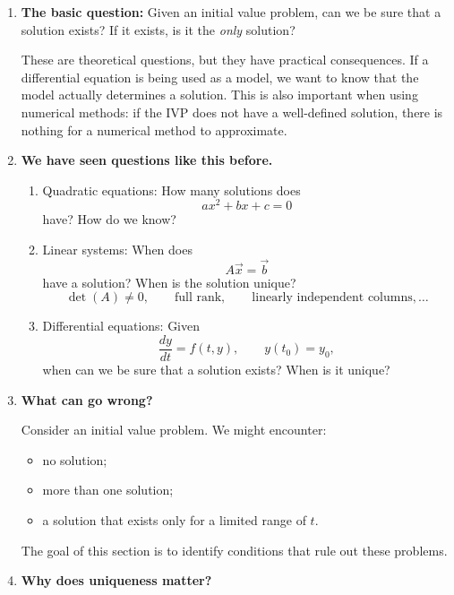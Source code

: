 \documentclass{article}
\begin{document}
\begin{enumerate}

\item \textbf{The basic question:} Given an initial value problem, can we be sure that a solution exists? If it exists, is it the \emph{only} solution?
    
These are theoretical questions, but they have practical consequences. If a differential equation is being used as a model, we want to know that the model actually determines a solution. This is also important when using numerical methods: if the IVP does not have a well-defined solution, there is nothing for a numerical method to approximate.

\item \textbf{We have seen questions like this before.}
\begin{enumerate}
    \item Quadratic equations: How many solutions does
    \[
    ax^2+bx+c=0
    \]
    have? How do we know?
    
    \item Linear systems: When does
    \[
    A\vec{x}=\vec{b}
    \]
    have a solution? When is the solution unique?
    \[
    \det(A)\neq 0,\qquad \text{full rank},\qquad
    \text{linearly independent columns},\ldots
    \]
    
    \item Differential equations: Given
    \[
    \frac{dy}{dt}=f(t,y),\qquad y(t_0)=y_0,
    \]
    when can we be sure that a solution exists? When is it unique?
\end{enumerate}

\item \textbf{What can go wrong?}

Consider an initial value problem. We might encounter:
\begin{itemize}
    \item no solution;
    \item more than one solution;
    \item a solution that exists only for a limited range of $t$.
\end{itemize}

The goal of this section is to identify conditions that rule out these problems.

\item \textbf{Why does uniqueness matter?}


\end{enumerate}
\end{document}
